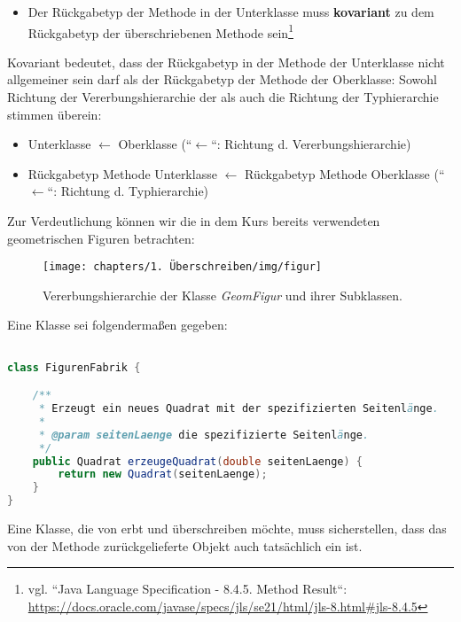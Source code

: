 \begin{itemize}
    \item Der Rückgabetyp der Methode in der Unterklasse muss \textbf{kovariant} zu dem Rückgabetyp der überschriebenen Methode sein\footnote{
        vgl. ``Java Language Specification - 8.4.5. Method Result``: \url{https://docs.oracle.com/javase/specs/jls/se21/html/jls-8.html#jls-8.4.5}
    }
\end{itemize}

Kovariant bedeutet, dass der Rückgabetyp in der Methode der Unterklasse nicht allgemeiner sein darf als der Rückgabetyp der Methode der Oberklasse:
Sowohl Richtung der Vererbungshierarchie der als auch die Richtung der Typhierarchie stimmen überein:

\begin{itemize}
    \item Unterklasse $\leftarrow$ Oberklasse (``$\leftarrow$``: Richtung d. Vererbungshierarchie)
    \item Rückgabetyp Methode Unterklasse $\leftarrow$ Rückgabetyp Methode Oberklasse (``$\leftarrow$``: Richtung d. Typhierarchie)
\end{itemize}

Zur Verdeutlichung können wir die in dem Kurs bereits verwendeten geometrischen Figuren betrachten:

\begin{figure}[h]
    \centering
    \texttt{[image: chapters/1. Überschreiben/img/figur]}
    \caption{Vererbungshierarchie der Klasse \textit{GeomFigur} und ihrer Subklassen.}
    \label{fig:figur}
\end{figure}

Eine Klasse  sei folgendermaßen gegeben:

\begin{lstlisting}[language=java]

class FigurenFabrik {

    /**
     * Erzeugt ein neues Quadrat mit der spezifizierten Seitenlänge.
     *
     * @param seitenLaenge die spezifizierte Seitenlänge.
     */
    public Quadrat erzeugeQuadrat(double seitenLaenge) {
        return new Quadrat(seitenLaenge);
    }
}
\end{lstlisting}

Eine Klasse, die von  erbt und  überschreiben möchte,
muss sicherstellen, dass das von der Methode zurückgelieferte Objekt auch tatsächlich ein  ist.

